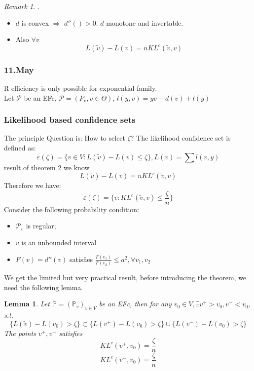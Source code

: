 \documentclass[a4paper,12pt, oneside, fleqn]{book}
\newtheorem{lemma}[theorem]{Lemma}
\theoremstyle{definition}
\theoremstyle{remark}
\newtheorem*{remark}{Remark}
\begin{document}
\begin{remark}.
	\begin{itemize}
		\item $d$ is convex $\Rightarrow$ $d''() >0$. $d$ monotone and invertable.
		\item Also $\forall v$ 
		\begin{equation*}
			L(\tilde{v}) - L(v) = n KL^c(\tilde{v}, v)
		\end{equation*}
	\end{itemize}
\end{remark}



\subsubsection*{11.May}
R efficiency is only possible for exponential family.\\
Let $\mathcal{P}$ be an EFc, $\mathcal{P} = (P_v, v \in \Theta)$, $l(y, v) = yv - d(v) + l(y)$




\subsubsection*{Likelihood based confidence sets}
The principle Question is: How to select $\zeta$? The likelihood confidence set is defined as:
\begin{equation*}
	\varepsilon(\zeta) = \{ v \in V: L(\tilde{v}) - L(v) \leq \zeta \}, L(v) = \sum l(v, y)
\end{equation*}
result of theorem 2 we know
\begin{equation*}
	L(\tilde{v}) - L(v) = n KL^c(\tilde{v}, v)
\end{equation*}
Therefore we have:
\begin{equation*}
	\varepsilon(\zeta) = \{v : KL^c(\tilde{v}, v) \leq \frac{\zeta}{n} \}
\end{equation*}
Consider the following probability condition:
\begin{itemize}
	\item $\mathcal{P}_v$ is regular;
	\item $v$ is an unbounded interval
	\item $F(v) = d''(v)$ satisfies $\frac{F(v_1)}{F(v_2)} \leq a^2, \forall v_1, v_2$
\end{itemize}
We get the limited but very practical result, before introducing the theorem, we need the following lemma.
\begin{lemma}
	Let $\mathbb{P} = (\mathbb{P}_v)_{v \in V}$ be an EFc, then for any $v_0 \in V, \exists v^+ > v_0, v^-< v_0$, s.t.
	\begin{equation*}
		\{ L(\tilde{v}) - L(v_0) > \zeta  \} \subset \{ L(v^+) - L(v_0) > \zeta\} \cup \{L(v^-) - L(v_0) > \zeta \}
	\end{equation*}
	The points $v^+, v^-$ satisfies 
	\begin{equation*}
		KL^c(v^+, v_0) = \frac{\zeta}{n}
	\end{equation*}
	\begin{equation*}
		KL^c(v^-, v_0) = \frac{\zeta}{n}
	\end{equation*}
\end{lemma}
\end{document}
